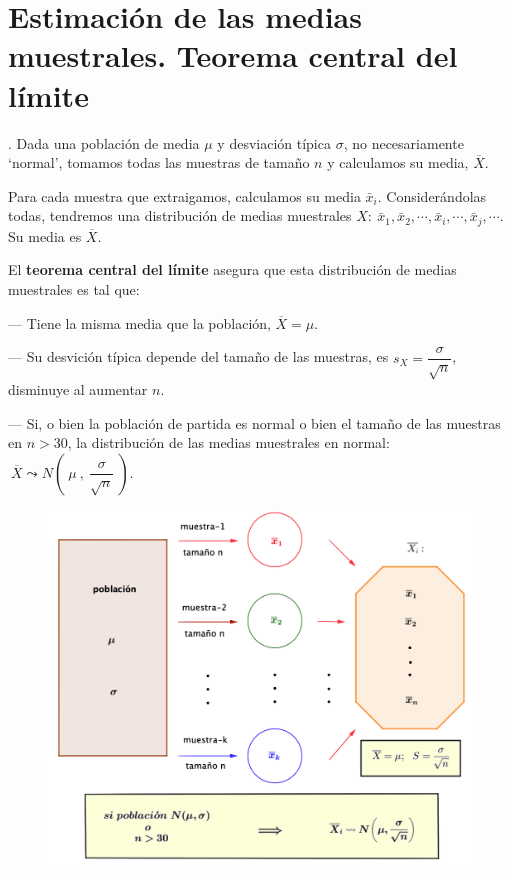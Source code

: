 \vspace{4mm}%
\section{Estimación de las medias muestrales. Teorema central del límite}

\vspace{4mm}%
\begin{theorem}
.	Dada una población de media $\mu$ y desviación típica $\sigma$, no necesariamente `normal', tomamos todas las muestras de tamaño $n$ y calculamos su media, $\overline X$. 

\vspace{2mm} \textcolor{gris}{Para cada muestra que extraigamos, calculamos su media $\bar x_i$. Considerándolas todas, tendremos una distribución de medias muestrales $X:\ \bar x_1, \bar x_2,\cdots, \bar x_i,\cdots , \bar x_j, \cdots$. Su media es $\overline X$.}

\vspace{2mm} El \textbf{teorema central del límite} asegura que esta distribución de medias muestrales es tal que:



\vspace{2mm} \hspace{1cm} --- Tiene la misma media que la población, $\overline X=\mu$.

\vspace{2mm} \hspace{1cm} ---  Su desvición típica depende del tamaño de las muestras, es $s_{X}=\dfrac{\sigma}{\sqrt{n}}$, disminuye al aumentar $n$.

\vspace{2mm} \hspace{1cm} ---  Si, o bien la población de partida es normal o bien el tamaño de las muestras en $n>30$, la distribución de las medias muestrales en normal: $\ \overline{X} \leadsto N\left( \ \mu \ , \ \dfrac{\sigma}{\sqrt{n}} \ \right)	$.

	\begin{figure}[H]
	\centering
	\includegraphics[width=.9\textwidth]{imagenes/imagenes05/T05IM04.png}
	\end{figure}


\end{theorem}
